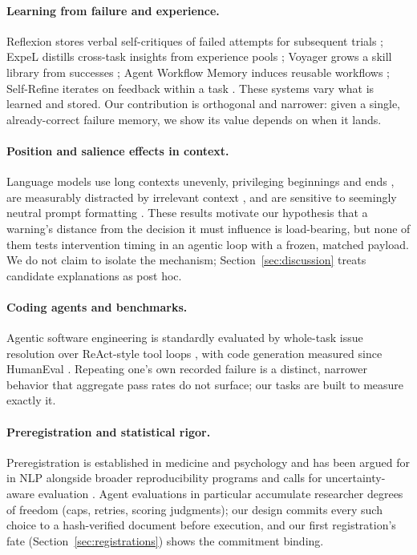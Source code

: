 \documentclass[11pt]{article}
\begin{document}
\paragraph{Learning from failure and experience.}
Reflexion stores verbal self-critiques of failed attempts for subsequent
trials \citep{shinn2023reflexion}; ExpeL distills cross-task insights from
experience pools \citep{zhao2023expel}; Voyager grows a skill library from
successes \citep{wang2023voyager}; Agent Workflow Memory induces reusable
workflows \citep{wang2024awm}; Self-Refine iterates on feedback within a task
\citep{madaan2023selfrefine}. These systems vary what is learned and stored.
Our contribution is orthogonal and narrower: given a single, already-correct
failure memory, we show its value depends on when it lands.

\paragraph{Position and salience effects in context.}
Language models use long contexts unevenly, privileging beginnings and ends
\citep{liu2024lost}, are measurably distracted by irrelevant context
\citep{shi2023distracted}, and are sensitive to seemingly neutral prompt
formatting \citep{sclar2023formatspread}. These results motivate our
hypothesis that a warning's distance from the decision it must influence is
load-bearing, but none of them tests intervention timing in an agentic loop
with a frozen, matched payload. We do not claim to isolate the mechanism;
Section~\ref{sec:discussion} treats candidate explanations as post hoc.

\paragraph{Coding agents and benchmarks.}
Agentic software engineering is standardly evaluated by whole-task issue
resolution \citep{jimenez2023swebench, yang2024sweagent, wang2024openhands}
over ReAct-style tool loops \citep{yao2023react, schick2023toolformer}, with
code generation measured since HumanEval \citep{chen2021humaneval}. Repeating
one's own recorded failure is a distinct, narrower behavior that aggregate
pass rates do not surface; our tasks are built to measure exactly it.

\paragraph{Preregistration and statistical rigor.}
Preregistration is established in medicine and psychology and has been argued
for in NLP \citep{vanmiltenburg2021preregistering} alongside broader
reproducibility programs \citep{pineau2021reproducibility} and calls for
uncertainty-aware evaluation \citep{miller2024errorbars}. Agent evaluations
in particular accumulate researcher degrees of freedom (caps, retries,
scoring judgments); our design commits every such choice to a hash-verified
document before execution, and our first registration's fate
(Section~\ref{sec:registrations}) shows the commitment binding.
\end{document}
